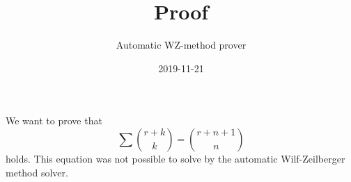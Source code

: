 \documentclass{article}
\title{Proof}
\author{Automatic WZ-method prover}
\date{2019-11-21}
\begin{document}
\maketitle
We want to prove that
\begin{equation}\label{Eq: 1}
\sum \binom{r+k}{k} = \binom{r+n+1}{n}
\end{equation}
holds. This equation was not possible to solve by the automatic Wilf-Zeilberger method solver.
\end{document}
